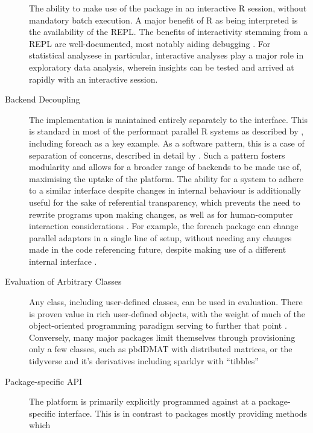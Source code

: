 \documentclass[a4paper,10pt]{article}
\begin{document}
\begin{description}
      The ability to make use of the package in an interactive R
      session, without mandatory batch execution.
      A major benefit of R as being interpreted is the availability
      of the REPL. The benefits of interactivity stemming from a REPL
      are well-documented, most notably aiding debugging
      \cite{mccarthy1978history}. For statistical analysese in 
      particular, interactive analyses play a major role in 
      exploratory data analysis, wherein insights can be tested
      and arrived at rapidly with an interactive session.
\item[Backend Decoupling]
      The implementation is maintained entirely separately to the
      interface.
      This is standard in most of the performant parallel R systems
      as described by \citeauthor{eddelbuettel2019parallel}, including
      foreach as a key example\cite{microsoft20}.
      As a software pattern, this is a case of separation of
      concerns, described in detail by \cite{dijkstra1982role}.
      Such a pattern fosters modularity and allows for a broader
      range of backends to be made use of, maximising the uptake of
      the platform.
      The ability for a system to adhere to a similar interface despite
	changes in internal behaviour is additionally useful for the sake of
	referential transparency, which prevents the need to rewrite
	programs upon making changes, as well as for human-computer
	interaction considerations \cite{sondergaard1990Rtda}
	\cite{norman2013design}.
      For example, the foreach package can change parallel adaptors in
      a single line of setup, without needing any changes made in the
      code referencing future, despite making use of a different internal
      interface \cite{weston19:_using}.
\item[Evaluation of Arbitrary Classes]
      Any class, including user-defined classes, can be used in
      evaluation.
      There is proven value in rich user-defined objects, with the
      weight of much of the object-oriented programming paradigm
      serving to further that point \cite{dahl2004simula}.
      Conversely, many major packages limit themselves through
      provisioning only a few classes, such as pbdDMAT with
      distributed matrices, or the tidyverse and it's derivatives
      including sparklyr with ``tibbles'' \cite{pbdDMATpackage}
      \cite{wickham2019welcome}
\item[Package-specific API]
      The platform is primarily explicitly programmed against at a
      package-specific interface. 
      This is in contrast to packages mostly providing methods which

\end{description}
\end{document}
